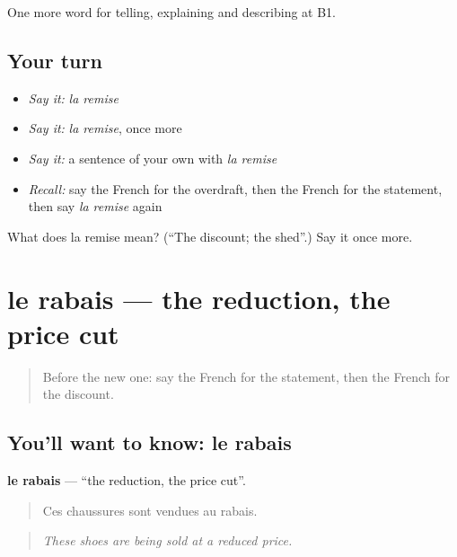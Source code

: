 \begin{grammarlens}[title={What you've built}]
One more word for telling, explaining and describing at B1.
\end{grammarlens}

\subsection*{Your turn}
\begin{itemize}
\raggedright
  \item \emph{Say it:} \emph{la remise}
  \item \emph{Say it:} \emph{la remise}, once more
  \item \emph{Say it:} a sentence of your own with \emph{la remise}
  \item \emph{Recall:} say the French for the overdraft, then the French for the statement, then say \emph{la remise} again
\end{itemize}

\begin{tcolorbox}[breakable,colback=teal!4,colframe=teal!35!black,title={Before you move on}]
What does la remise mean? (\textquotedblleft{}The discount; the shed\textquotedblright{}.) Say it once more.
\end{tcolorbox}
\section[le rabais]{le rabais — the reduction, the price cut}

\label{lesson:FR-C452-rabais}



\begin{quote}
Before the new one: say the French for the statement, then the French for the discount.
\end{quote}

\subsection*{You'll want to know: le rabais}
\textbf{le rabais} — \textquotedblleft{}the reduction, the price cut\textquotedblright{}.

\begin{quote}
Ces chaussures sont vendues au rabais.
\end{quote}

\begin{quote}
\emph{These shoes are being sold at a reduced price.}
\end{quote}

